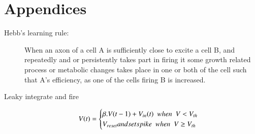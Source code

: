 
\chapter*{\centering Appendices}%
\begin{center}
\end{center}
\begin{description}
    \item[Hebb's learning rule:]\cite{hebbs} When an axon of a cell A is sufficiently
    close to excite a cell B, and repeatedly and or persistently takes part in
    firing it some growth related process or metabolic changes takes place in one
    or both of the cell such that A's efficiency, as one of the cells firing B is
    increased.
    \item[Leaky integrate and fire]\cite{leakyintegrate}
    \begin{equation*}
        V(t)=\begin{cases}
            \beta.V(t-1)+V_{in}(t) \hspace{5px} when \hspace{5px} V<V_{th} \\
            V_{reset} and set spike\hspace{5px} when \hspace{5px} V\ge V_{th}
        \end{cases}
    \end{equation*}

\end{description}


